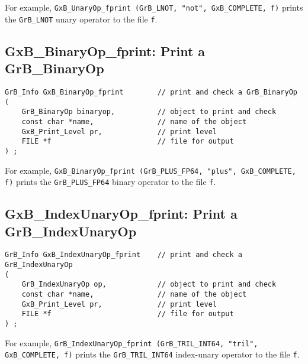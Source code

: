 \documentclass[12pt]{article}
\begin{document}
For example,
\verb'GxB_UnaryOp_fprint (GrB_LNOT, "not", GxB_COMPLETE, f)'
prints the \verb'GrB_LNOT' unary operator to the file \verb'f'.


\subsection{{\sf GxB\_BinaryOp\_fprint:} Print a {\sf GrB\_BinaryOp}}

\begin{mdframed}[userdefinedwidth=6in]
{\footnotesize
\begin{verbatim}
GrB_Info GxB_BinaryOp_fprint        // print and check a GrB_BinaryOp
(
    GrB_BinaryOp binaryop,          // object to print and check
    const char *name,               // name of the object
    GxB_Print_Level pr,             // print level
    FILE *f                         // file for output
) ;
\end{verbatim} } \end{mdframed}

For example,
\verb'GxB_BinaryOp_fprint (GrB_PLUS_FP64, "plus", GxB_COMPLETE, f)' prints the
\verb'GrB_PLUS_FP64' binary operator to the file \verb'f'.


\subsection{{\sf GxB\_IndexUnaryOp\_fprint:} Print a {\sf GrB\_IndexUnaryOp}}

\begin{mdframed}[userdefinedwidth=6in]
{\footnotesize
\begin{verbatim}
GrB_Info GxB_IndexUnaryOp_fprint    // print and check a GrB_IndexUnaryOp
(
    GrB_IndexUnaryOp op,            // object to print and check
    const char *name,               // name of the object
    GxB_Print_Level pr,             // print level
    FILE *f                         // file for output
) ;
\end{verbatim} } \end{mdframed}

For example,
\verb'GrB_IndexUnaryOp_fprint (GrB_TRIL_INT64, "tril", GxB_COMPLETE, f)' prints
the \verb'GrB_TRIL_INT64' index-unary operator to the file \verb'f'.
\end{document}

